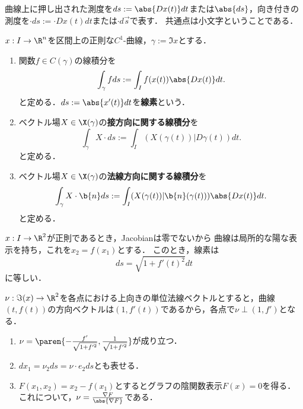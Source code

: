 \documentclass[uplatex,dvipdfmx]{jsreport}
\begin{document}
\begin{tcolorbox}[colframe=ForestGreen, colback=ForestGreen!10!white,breakable,colbacktitle=ForestGreen!40!white,coltitle=black,fonttitle=\bfseries\sffamily,
title=]
    曲線上に押し出された測度を$ds:=\abs{Dx(t)}dt$または$\abs{ds}$，向き付きの測度を$\cdot ds:=\cdot Dx(t)dt$または$\cdot d\vec{s}$で表す．
    共通点は小文字ということである．
\end{tcolorbox}

\begin{definition}[関数とベクトル場の線積分]
    $x:I\to\R^n$を区間上の正則な$C^1$-曲線，$\gamma:=\Im x$とする．
    \begin{enumerate}
        \item 関数$f\in C(\gamma)$の線積分を
        \[\int_\gamma fds:=\int_If(x(t))\abs{Dx(t)}dt.\]
        と定める．$ds:=\abs{x'(t)}dt$を\textbf{線素}という．
        \item ベクトル場$X\in\X(\gamma)$の\textbf{接方向に関する線積分}を
        \[\int_\gamma X\cdot ds:=\int_I(X(\gamma(t))|D\gamma(t))dt.\]
        と定める．
        \item ベクトル場$X\in\X(\gamma)$の\textbf{法線方向に関する線積分}を
        \[\int_\gamma X\cdot\b{n}ds:=\int_I(X(\gamma(t))|\b{n}(\gamma(t)))\abs{Dx(t)}dt.\]
        と定める．
    \end{enumerate}
\end{definition}

\begin{proposition}[線素の陽関数による表示]
    $x:I\to\R^2$が正則であるとき，Jacobianは零でないから
    曲線は局所的な陽な表示を持ち，これを$x_2=f(x_1)$とする．
    このとき，線素は
    \[ds=\sqrt{1+f'(t)^2}dt\]
    に等しい．
\end{proposition}

\begin{proposition}[線素の単位法線ベクトルによる表示]
    $\nu:\Im(x)\to\R^2$を各点における上向きの単位法線ベクトルとすると，曲線$(t,f(t))$の方向ベクトルは$(1,f'(t))$であるから，各点で$\nu\perp(1,f')$となる．
    \begin{enumerate}
        \item $\nu=\paren{-\frac{f'}{\sqrt{1+f'^2}},\frac{1}{\sqrt{1+f'^2}}}$が成り立つ．
        \item $dx_1=\nu_2ds=\nu\cdot e_2ds$とも表せる．
        \item $F(x_1,x_2)=x_2-f(x_1)$とするとグラフの陰関数表示$F(x)=0$を得る．これについて，$\nu=\frac{\nabla F}{\abs{\nabla F}}$である．
    \end{enumerate}
\end{proposition}
\end{document}
